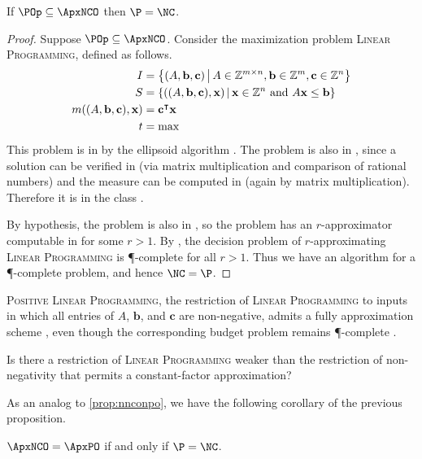 \documentclass[]{article}
\let\originalleft\left
\let\originalright\right
\renewcommand{\left}{\mathopen{}\mathclose\bgroup\originalleft}
\renewcommand{\right}{\aftergroup\egroup\originalright}
\begin{document}
\begin{proposition}\label{prop:popapxnco}
  If $\POp \subseteq \ApxNCO$ then $\P = \NC$.
\end{proposition}
\begin{proof}
  Suppose $\POp \subseteq \ApxNCO$.
  Consider the maximization problem \textsc{Linear Programming}, defined as follows.
  \begin{align*}
    I & = \left\{(A, \mathbf{b}, \mathbf{c}) \, \middle| \, A \in \mathbb{Z}^{m \times n}, \mathbf{b} \in \mathbb{Z}^m, \mathbf{c} \in \mathbb{Z}^n \right\} \\
    S & = \left\{((A, \mathbf{b}, \mathbf{c}), \mathbf{x}) \, \middle| \, \mathbf{x} \in \mathbb{Z}^n \text{ and } A\mathbf{x} \leq \mathbf{b}\right\} \\
    m((A, \mathbf{b}, \mathbf{c}), \mathbf{x}) & = \mathbf{c}^\intercal\mathbf{x} \\
    t & = \max
  \end{align*}
  This problem is in \PO{} by the ellipsoid algorithm \cite{khachian79}.
  The problem is also in \NNCO{}, since a solution can be verified in \NC{} (via matrix multiplication and comparison of rational numbers) and the measure can be computed in \NC{} (again by matrix multiplication).
  Therefore it is in the class \POp.

  By hypothesis, the problem is also in \ApxNCO{}, so the problem has an $r$-approximator computable in \NC{} for some $r > 1$.
  By \cite[Theorem~8.2.7]{dsst97}, the decision problem of $r$-approximating \textsc{Linear Programming} is \P-complete for all $r > 1$.
  Thus we have an \NC{} algorithm for a \P-complete problem, and hence $\NC = \P$.
\end{proof}

\textsc{Positive Linear Programming}, the restriction of \textsc{Linear Programming} to inputs in which all entries of $A$, $\mathbf{b}$, and $\mathbf{c}$ are non-negative, admits a fully \NC{} approximation scheme \cite{ln93}, even though the corresponding budget problem remains \P-complete \cite{tx98}.
\begin{openquestion}
  Is there a restriction of \textsc{Linear Programming} weaker than the restriction of non-negativity that permits a constant-factor \NC{} approximation?
\end{openquestion}

As an analog to \autoref{prop:nnconpo}, we have the following corollary of the previous proposition.

\begin{corollary}
  $\ApxNCO = \ApxPO$ if and only if $\P = \NC$.
\end{corollary}
\end{document}
